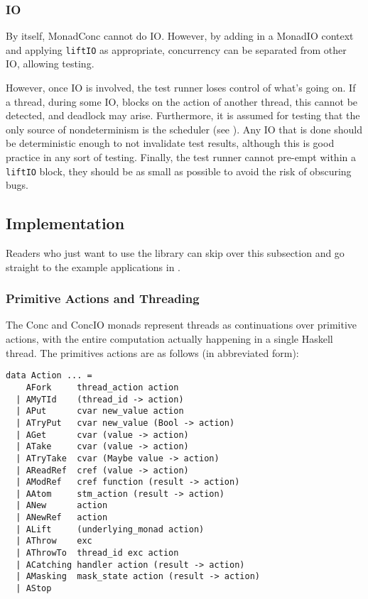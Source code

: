 \subsubsection*{IO}
\label{sec:prelims-dejafu-testing-io}

By itself, MonadConc cannot do IO. However, by adding in a MonadIO
context and applying \texttt{liftIO} as appropriate, concurrency
can be separated from other IO, allowing testing.

However, once IO is involved, the test runner loses control of what's
going on. If a thread, during some IO, blocks on the action of another
thread, this cannot be detected, and deadlock may arise. Furthermore,
it is assumed for testing that the only source of nondeterminism is
the scheduler (see ). Any IO that is done should be
deterministic enough to not invalidate test results, although this is
good practice in any sort of testing. Finally, the test runner cannot
pre-empt within a \texttt{liftIO} block, they should be as small as
possible to avoid the risk of obscuring bugs.

\subsection{Implementation}
\label{sec:prelims-dejafu-impl}

Readers who just want to use the \dejafu{} library can skip over this
subsection and go straight to the example applications in .

\subsubsection*{Primitive Actions and Threading}
\label{impl-prims}

The Conc and ConcIO monads represent threads as continuations over
primitive actions, with the entire computation actually happening in a
single Haskell thread. The primitives actions are as follows (in
abbreviated form):

\begin{verbatim}
data Action ... =
    AFork     thread_action action
  | AMyTId    (thread_id -> action)
  | APut      cvar new_value action
  | ATryPut   cvar new_value (Bool -> action)
  | AGet      cvar (value -> action)
  | ATake     cvar (value -> action)
  | ATryTake  cvar (Maybe value -> action)
  | AReadRef  cref (value -> action)
  | AModRef   cref function (result -> action)
  | AAtom     stm_action (result -> action)
  | ANew      action
  | ANewRef   action
  | ALift     (underlying_monad action)
  | AThrow    exc
  | AThrowTo  thread_id exc action
  | ACatching handler action (result -> action)
  | AMasking  mask_state action (result -> action)
  | AStop
\end{verbatim}

